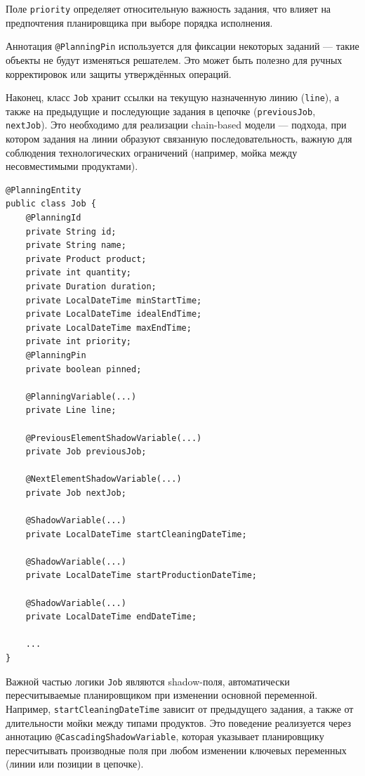 Поле \texttt{priority} определяет относительную важность задания, что влияет на предпочтения планировщика при выборе порядка исполнения.

Аннотация \texttt{@PlanningPin} используется для фиксации некоторых заданий — такие объекты не будут изменяться решателем. Это может быть полезно для ручных корректировок или защиты утверждённых операций.

Наконец, класс \texttt{Job} хранит ссылки на текущую назначенную линию (\texttt{line}), а также на предыдущие и последующие задания в цепочке (\texttt{previousJob}, \texttt{nextJob}). Это необходимо для реализации chain-based модели — подхода, при котором задания на линии образуют связанную последовательность, важную для соблюдения технологических ограничений (например, мойка между несовместимыми продуктами).

\begin{lstlisting}[caption={Класс Job}, label={lst:classJob}]
@PlanningEntity
public class Job {
    @PlanningId
    private String id;
    private String name;
    private Product product;
    private int quantity;
    private Duration duration;
    private LocalDateTime minStartTime;
    private LocalDateTime idealEndTime;
    private LocalDateTime maxEndTime;
    private int priority;
    @PlanningPin
    private boolean pinned;

    @PlanningVariable(...)
    private Line line;

    @PreviousElementShadowVariable(...)
    private Job previousJob;

    @NextElementShadowVariable(...)
    private Job nextJob;

    @ShadowVariable(...)
    private LocalDateTime startCleaningDateTime;

    @ShadowVariable(...)
    private LocalDateTime startProductionDateTime;

    @ShadowVariable(...)
    private LocalDateTime endDateTime;

    ...
}
\end{lstlisting}

Важной частью логики \texttt{Job} являются shadow-поля, автоматически пересчитываемые планировщиком при изменении основной переменной. Например, \texttt{startCleaningDateTime} зависит от предыдущего задания, а также от длительности мойки между типами продуктов. Это поведение реализуется через аннотацию \texttt{@CascadingShadowVariable}, которая указывает планировщику пересчитывать производные поля при любом изменении ключевых переменных (линии или позиции в цепочке).

